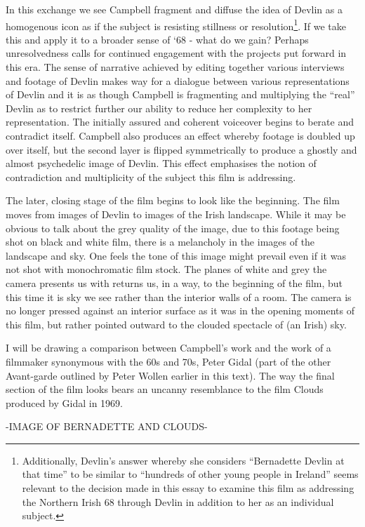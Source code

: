 \documentclass[12pt]{article}
\begin{document}
In this exchange we see Campbell fragment and diffuse the idea of Devlin as a homogenous icon as if the subject is resisting stillness or resolution\footnote{Additionally, Devlin’s answer whereby she considers “Bernadette Devlin at that time” to be similar to “hundreds of other young people in Ireland” seems relevant to the decision made in this essay to examine this film as addressing the Northern Irish 68 through Devlin in addition to her as an individual subject.}. If we take this and apply it to a broader sense of `68 - what do we gain? Perhaps unresolvedness calls for continued engagement with the projects put forward in this era. The sense of narrative achieved by editing together various interviews and footage of Devlin makes way for a dialogue between various representations of Devlin and it is as though Campbell is fragmenting and multiplying the ``real'' Devlin as to restrict further our ability to reduce her complexity to her representation. The initially assured and coherent voiceover begins to berate and contradict itself. Campbell also produces an effect whereby footage is doubled up over itself, but the second layer is flipped symmetrically to produce a ghostly and almost psychedelic image of Devlin. This effect emphasises the notion of contradiction and multiplicity of the subject this film is addressing. 

The later, closing stage of the film begins to look like the beginning. The film moves from images of Devlin to images of the Irish landscape. While it may be obvious to talk about the grey quality of the image, due to this footage being shot on black and white film, there is a melancholy in the images of the landscape and sky. One feels the tone of this image might prevail even if it was not shot with monochromatic film stock. The planes of white and grey the camera presents us with returns us, in a way, to the beginning of the film, but this time it is sky we see rather than the interior walls of a room. The camera is no longer pressed against an interior surface as it was in the opening moments of this film, but rather pointed outward to the clouded spectacle of (an Irish) sky. 

I will be drawing a comparison between Campbell's work and the work of a filmmaker synonymous with the 60s and 70s, Peter Gidal (part of the other Avant-garde outlined by Peter Wollen earlier in this text). The way the final section of the film looks bears an uncanny resemblance to the film Clouds produced by Gidal in 1969. 

-IMAGE OF BERNADETTE AND CLOUDS- 
\end{document}
